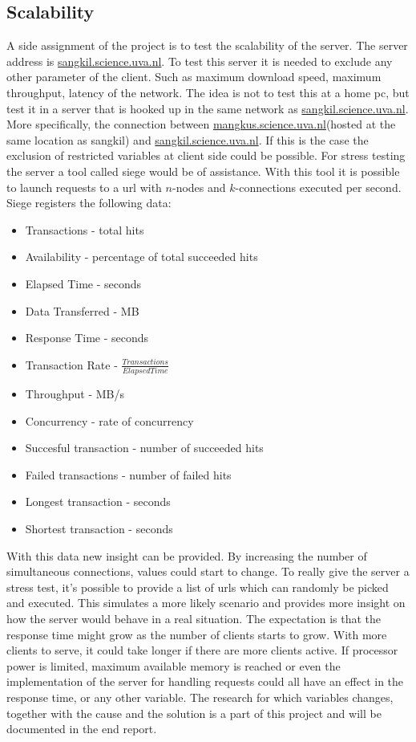 \subsection{Scalability}
\label{sec:scalability}
A side assignment of the project is to test the scalability of the server. The server address is \url{sangkil.science.uva.nl}. To test this server it is needed to exclude any other parameter of the client. Such as maximum download speed, maximum throughput, latency of the network. The idea is not to test this at a home pc, but test it in a server that is hooked up in the same network as \url{sangkil.science.uva.nl}. More specifically, the connection between \url{mangkus.science.uva.nl}(hosted at the same location as sangkil) and \url{sangkil.science.uva.nl}. If this is the case the exclusion of restricted variables at client side could be possible. 
For stress testing the server a tool called siege \cite{Siege} would be of assistance. With this tool it is possible to launch requests to a url with $n$-nodes and $k$-connections executed per second. Siege registers the following data:
\begin{itemize}
\item Transactions - total hits
\item Availability - percentage of total succeeded hits
\item Elapsed Time - seconds
\item Data Transferred - MB
\item Response Time - seconds
\item Transaction Rate - $\frac{Transactions}{Elapsed Time}$
\item Throughput - MB/s
\item Concurrency - rate of concurrency
\item Succesful transaction - number of succeeded hits
\item Failed transactions - number of failed hits
\item Longest transaction - seconds
\item Shortest transaction - seconds
\end{itemize}
With this data new insight can be provided. By increasing the number of simultaneous connections, values could start to change. To really give the server a stress test, it's possible to provide a list of urls which can randomly be picked and executed. This simulates a more likely scenario and provides more insight on how the server would behave in a real situation. The expectation is that the response time might grow as the number of clients starts to grow. With more clients to serve, it could take longer if there are more clients active. If processor power is limited, maximum available memory is reached or even the implementation of the server for handling requests could all have an effect in the response time, or any other variable. The research for which variables changes, together with the cause and the solution is a part of this project and will be documented in the end report. 


